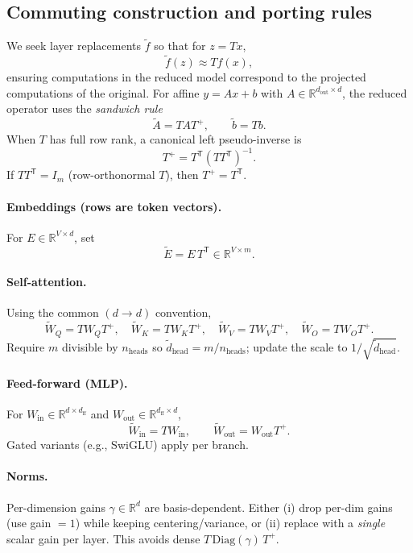 \documentclass{article}
\newcommand{\R}{\mathbb{R}}
\newcommand{\Trans}{\mathsf{T}}
\begin{document}
\subsection{Commuting construction and porting rules}
We seek layer replacements $\tilde{f}$ so that for $z=Tx$,
\begin{equation}
\label{eq:commute}
\tilde{f}(z) \approx T f(x),
\end{equation}
ensuring computations in the reduced model correspond to the projected computations
of the original. For affine $y=Ax+b$ with $A\in\R^{d_\text{out}\times d}$,
the reduced operator uses the \emph{sandwich rule}
\begin{equation}
\label{eq:sandwich}
\tilde{A} = T A T^+,\qquad \tilde{b}=Tb.
\end{equation}
When $T$ has full row rank, a canonical left pseudo-inverse is
\begin{equation}
\label{eq:pseudoinv}
T^+ = T^\Trans (TT^\Trans)^{-1}.
\end{equation}
If $TT^\Trans=I_m$ (row-orthonormal $T$), then $T^+=T^\Trans$.

\paragraph{Embeddings (rows are token vectors).}
For $E\in\R^{V\times d}$, set
\[
\tilde{E} = E\,T^\Trans\in\R^{V\times m}.
\]
\paragraph{Self-attention.}
Using the common $(d\!\to\!d)$ convention,
\[
\tilde{W}_Q=T W_Q T^+,\quad
\tilde{W}_K=T W_K T^+,\quad
\tilde{W}_V=T W_V T^+,\quad
\tilde{W}_O=T W_O T^+.
\]
Require $m$ divisible by $n_\text{heads}$ so $\tilde{d}_\text{head}=m/n_\text{heads}$;
update the scale to $1/\sqrt{\tilde{d}_\text{head}}$.

\paragraph{Feed-forward (MLP).}
For $W_\text{in}\in\R^{d\times d_\text{ff}}$ and $W_\text{out}\in\R^{d_\text{ff}\times d}$,
\[
\tilde{W}_\text{in}=T W_\text{in},\qquad
\tilde{W}_\text{out}=W_\text{out} T^+.
\]
Gated variants (e.g., SwiGLU) apply per branch.

\paragraph{Norms.}
Per-dimension gains $\gamma\in\R^d$ are basis-dependent. Either (i) drop per-dim gains
(use gain $=1$) while keeping centering/variance, or (ii) replace with a \emph{single}
scalar gain per layer. This avoids dense $T\,\mathrm{Diag}(\gamma)\,T^+$.
\end{document}
